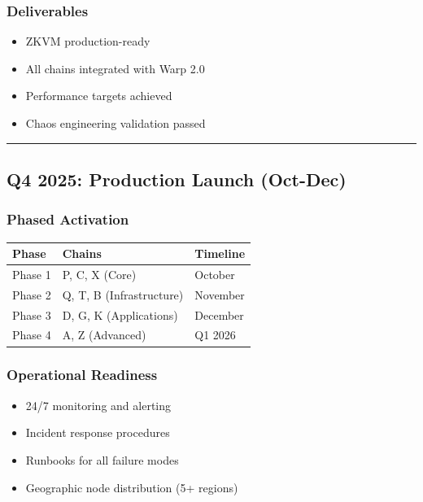 \documentclass[
]{article}
\newcounter{none} %
\providecommand{\tightlist}{%
  \setlength{\itemsep}{0pt}\setlength{\parskip}{0pt}}
\begin{document}
\subsubsection{Deliverables}\label{deliverables-2}

\begin{itemize}
\tightlist
\item[$\square$]
  ZKVM production-ready
\item[$\square$]
  All chains integrated with Warp 2.0
\item[$\square$]
  Performance targets achieved
\item[$\square$]
  Chaos engineering validation passed
\end{itemize}

\begin{center}\rule{0.5\linewidth}{0.5pt}\end{center}

\subsection{Q4 2025: Production Launch
(Oct-Dec)}\label{q4-2025-production-launch-oct-dec}

\subsubsection{Phased Activation}\label{phased-activation}

{\def\LTcaptype{none} %
\begin{longtable}[]{@{}lll@{}}
\toprule\noalign{}
Phase & Chains & Timeline \\
\midrule\noalign{}
\endhead
\bottomrule\noalign{}
\endlastfoot
Phase 1 & P, C, X (Core) & October \\
Phase 2 & Q, T, B (Infrastructure) & November \\
Phase 3 & D, G, K (Applications) & December \\
Phase 4 & A, Z (Advanced) & Q1 2026 \\
\end{longtable}
}

\subsubsection{Operational Readiness}\label{operational-readiness}

\begin{itemize}
\tightlist
\item[$\square$]
  24/7 monitoring and alerting
\item[$\square$]
  Incident response procedures
\item[$\square$]
  Runbooks for all failure modes
\item[$\square$]
  Geographic node distribution (5+ regions)
\end{itemize}
\end{document}
